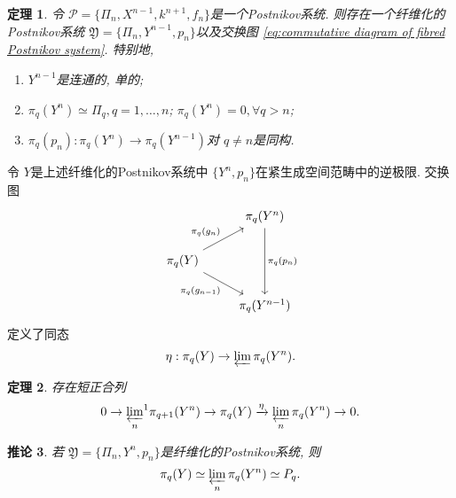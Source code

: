 \documentclass{ctexart}
\theoremstyle{plain}
\newtheorem{theorem}{定理}[section]
\newtheorem{corollary}[theorem]{推论}
\theoremstyle{definition}
\begin{document}
        \begin{theorem}
            \label{thm:fibration of Postnikov system}
            令 $\mathscr{P}=\{\Pi_{n}, X^{n-1}, k^{n+1},f_{n}\}$是一个Postnikov系统. 则存在一个纤维化的Postnikov系统 $\mathfrak{Y}=\{\Pi_{n}, Y^{n-1}, p_{n}\}$以及交换图 \ref{eq:commutative diagram of fibred Postnikov system}. 特别地, 
            \begin{enumerate}
                \item $Y^{n-1}$是连通的, 单的;
                \item $\pi_{q}(Y^{n})\simeq \Pi_{q},q=1, \ldots ,n$; $\pi_{q}(Y^{n})=0, \forall q> n$;
                \item $\pi_{q}(p_{n}):\pi_{q}(Y^{n})\to \pi_{q}(Y^{n-1})$对 $q\neq n$是同构.
            \end{enumerate}
        \end{theorem}

        令 $Y$是上述纤维化的Postnikov系统中 $\{Y^{n},p_{n}\}$在紧生成空间范畴中的逆极限. 交换图
        \begin{equation*}
          \begin{tikzcd}
            & \pi_{q}(Y^{n}) \arrow[dd, "\pi_{q}(p_{n})"] \\
            \pi_{q}(Y) \arrow[ru, "\pi_{q}(g_{n})"] \arrow[rd, "\pi_{q}(g_{n-1})"'] & \\
            & \pi_{q}(Y^{n-1})
          \end{tikzcd}
        \end{equation*}
        定义了同态 
        \begin{equation*}
          \eta:\pi_{q}(Y)\to \varprojlim \pi_{q}(Y^{n}).
        \end{equation*}

        \begin{theorem}
            存在短正合列
            \begin{equation*}
              0\to {\varprojlim_{n}}^{1} \pi_{q+1}(Y^{n})\to \pi_{q}(Y) \xrightarrow{\eta} \varprojlim_{n} \pi_{q}(Y^{n})\to 0.
            \end{equation*}
        \end{theorem}

        \begin{corollary}
            若 $\mathfrak{Y}=\{\Pi_n, Y^n, p_n\}$是纤维化的Postnikov系统, 则 
            \begin{equation*}
              \pi_{q}(Y)\simeq \varprojlim_{n} \pi_{q}(Y^{n})\simeq P_{q}.
            \end{equation*}
        \end{corollary}
\end{document}
